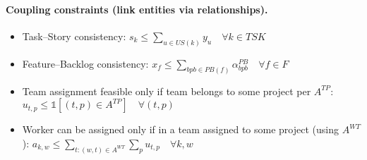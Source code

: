 \documentclass[11pt,a4paper]{article}
\begin{document}
\paragraph{Coupling constraints (link entities via relationships).}
\begin{itemize}[leftmargin=2em]
  \item Task--Story consistency:
  \(
    s_k \le \sum_{u\in US(k)} y_u \quad \forall k\in TSK
  \)
  \item Feature--Backlog consistency:
  \(
    x_f \le \sum_{bpb\in PB(f)} \alpha^{PB}_{bpb} \quad \forall f\in F
  \)
  \item Team assignment feasible only if team belongs to some project per $A^{TP}$:
  \(
    u_{t,p} \le \mathbb{1}[(t,p)\in A^{TP}] \quad \forall (t,p)
  \)
  \item Worker can be assigned only if in a team assigned to some project (using $A^{WT}$):
  \(
    a_{k,w} \le \sum_{t:(w,t)\in A^{WT}}\sum_{p} u_{t,p} \quad \forall k,w
  \)
\end{itemize}
\end{document}
